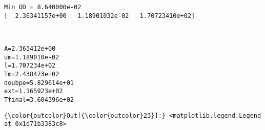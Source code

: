 \documentclass[11pt]{article}
\begin{document}
    \begin{Verbatim}[commandchars=\\\{\}]
Min OD = 8.640000e-02
[  2.36341157e+00   1.18901032e-02   1.70723410e+02]

    \end{Verbatim}

    \begin{center}
    \end{center}
    { \hspace*{\fill} \\}
    
    \begin{Verbatim}[commandchars=\\\{\}]
A=2.363412e+00
um=1.189010e-02
l=1.707234e+02
Tm=2.438473e+02
doubpe=5.829614e+01
ext=1.165923e+02
Tfinal=3.604396e+02

    \end{Verbatim}

            \begin{Verbatim}[commandchars=\\\{\}]
{\color{outcolor}Out[{\color{outcolor}23}]:} <matplotlib.legend.Legend at 0x1d71b3383c8>
\end{Verbatim}
        
    \begin{center}
    \end{center}
    { \hspace*{\fill} \\}
    
    \begin{center}
    \end{center}
    { \hspace*{\fill} \\}
    
\end{document}
